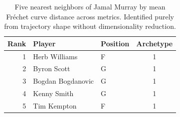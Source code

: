 \begin{table}[htbp]
  \centering\small
  \begin{tabular}{rllc}
    \toprule
    Rank & Player & Position & Archetype \\
    \midrule
    1 & Herb Williams & F & 1 \\
    2 & Byron Scott & G & 1 \\
    3 & Bogdan Bogdanovic & G & 1 \\
    4 & Kenny Smith & G & 1 \\
    5 & Tim Kempton & F & 1 \\
    \bottomrule
  \end{tabular}
  \caption{Five nearest neighbors of Jamal Murray by mean Fr\'{e}chet curve distance across metrics. Identified purely from trajectory shape without dimensionality reduction.}
  \label{tab:Jamal_Murray_frechet_curve_neighbors}
\end{table}

